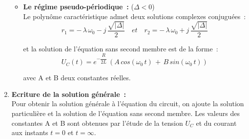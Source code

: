\begin{enumerate}
\begin{itemize}
		\bigskip
		\item \textbf{Le régime pseudo-périodique~:} ($\Delta < 0 $)\\	

			Le polynôme caractéristique admet deux solutions complexes conjuguées~:
			$$ r_1 =  -\,\lambda\,\omega_0 - j\,\dfrac{\sqrt{|\Delta|}}{ 2 } \quad et \quad	r_2 = -\,\lambda\,\omega_0 + j\,\dfrac{\sqrt{|\Delta|}}{ 2 }  $$

			et la solution de l'équation sans second membre est de la forme~:\\
				$$U_C(t) = e^{-\dfrac{R}{2L}}\,(A\,cos(\omega_0\,t)\,+\,B\,sin(\omega_0\,t))$$

				avec A et B deux constantes réelles.

		\end{itemize}
	\bigskip
	\item \textbf{Ecriture de la solution générale~:}\\

Pour obtenir la solution générale à l'équation du circuit, on ajoute la solution particulière et la solution de l'équation sans second membre. Les valeurs des constantes A et B sont obtenues par l'étude de la tension $U_C$ et du courant aux instants $t=0$ et $t=\infty$.

\end{enumerate}


